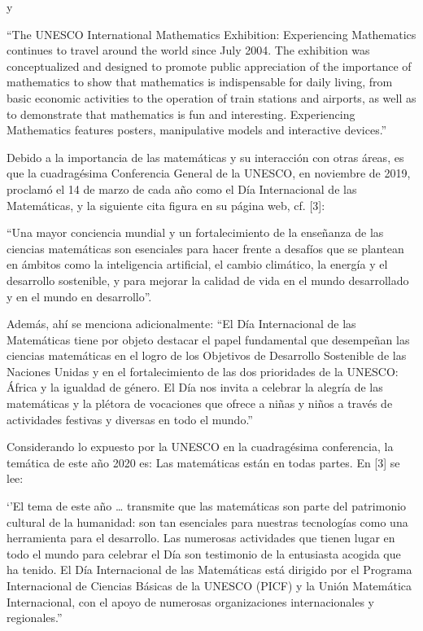 y

    “The UNESCO International Mathematics Exhibition: Experiencing Mathematics continues to travel around the world since July 2004. The exhibition was conceptualized and designed to promote public appreciation of the importance of mathematics to show that mathematics is indispensable for daily living, from basic economic activities to the operation of train stations and airports, as well as to demonstrate that mathematics is fun and interesting. Experiencing Mathematics features posters, manipulative models and interactive devices.”
    
Debido a la importancia de las matemáticas y su interacción con otras áreas, es que la cuadragésima Conferencia General de la UNESCO, en noviembre de 2019, proclamó el 14 de marzo de cada año como el Día Internacional de las Matemáticas, y la siguiente cita figura en su página web, cf. [3]: 

    “Una mayor conciencia mundial y un fortalecimiento de la enseñanza de las ciencias matemáticas son esenciales para hacer frente a desafíos que se plantean en ámbitos como la inteligencia artificial, el cambio climático, la energía y el desarrollo sostenible, y para mejorar la calidad de vida en el mundo desarrollado y en el mundo en desarrollo”. 

    Además, ahí se menciona adicionalmente: 
    “El Día Internacional de las Matemáticas tiene por objeto destacar el papel fundamental que desempeñan las ciencias matemáticas en el logro de los Objetivos de Desarrollo Sostenible de las Naciones Unidas y en el fortalecimiento de las dos prioridades de la UNESCO: África y la igualdad de género. El Día nos invita a celebrar la alegría de las matemáticas y la plétora de vocaciones que ofrece a niñas y niños a través de actividades festivas y diversas en todo el mundo.”
    
 Considerando lo expuesto por la UNESCO en la cuadragésima conferencia, la temática de este año 2020 es: Las matemáticas están en todas partes. En [3] se lee:
 
    ‘’El tema de este año … transmite que las matemáticas son parte del patrimonio cultural de la humanidad: son tan esenciales para nuestras tecnologías como una herramienta para el desarrollo. Las numerosas actividades que tienen lugar en todo el mundo para celebrar el Día son testimonio de la entusiasta acogida que ha tenido. El Día Internacional de las Matemáticas está dirigido por el Programa Internacional de Ciencias Básicas de la UNESCO (PICF) y la Unión Matemática Internacional, con el apoyo de numerosas organizaciones internacionales y regionales.”
    
